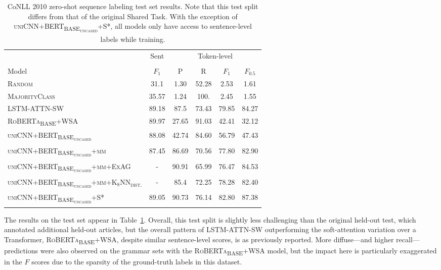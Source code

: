 \documentclass{clv3}
\begin{document}
\begin{table}
\caption[Main results]{CoNLL 2010 zero-shot sequence labeling test set results. Note that this test split differs from that of the original Shared Task. With the exception of \textsc{uniCNN+BERT\textsubscript{BASE\textsubscript{uncased}}+S*}, all models only have access to sentence-level labels while training.} 
\label{table:conll2010-test-results}
\begin{tabular}{lccccc}
\toprule
 & \multicolumn{1}{c}{Sent} & \multicolumn{4}{c}{Token-level} \\
 \cmidrule[0.75pt](lr){2-2}\cmidrule[0.75pt](lr){3-6} \\
Model & $F_1$ & P & R & $F_1$ & $F_{0.5}$ \\
\midrule
\textsc{Random} & 31.1 & 1.30 & 52.28 & 2.53 & 1.61 \\
\textsc{MajorityClass} & 35.57 & 1.24 & 100. & 2.45 & 1.55 \\
\midrule
\textsc{LSTM-ATTN-SW} & 89.18 & 87.5 & 73.43 & 79.85 & 84.27 \\
\textsc{RoBERTa\textsubscript{BASE}+WSA} & 89.97 & 27.65 & 91.03 & 42.41 & 32.12 \\
\midrule
\textsc{uniCNN+BERT\textsubscript{BASE\textsubscript{uncased}}} & 88.08 & 42.74 & 84.60 & 56.79 & 47.43 \\
\textsc{uniCNN+BERT\textsubscript{BASE\textsubscript{uncased}}+mm} & 87.45 & 86.69 & 70.56 & 77.80 & 82.90 \\
\textsc{uniCNN+BERT\textsubscript{BASE\textsubscript{uncased}}+mm+ExAG} & - & 90.91 & 65.99 & 76.47 & 84.53 \\
\textsc{uniCNN+BERT\textsubscript{BASE\textsubscript{uncased}}+mm+K$_8$NN\textsubscript{dist.}} & - & 85.4 & 72.25 & 78.28 & 82.40 \\
\midrule
\textsc{uniCNN+BERT\textsubscript{BASE\textsubscript{uncased}}+S*} & 89.05 & 90.73 & 76.14 & 82.80 & 87.38 \\
\bottomrule
\end{tabular}
\end{table} 

The results on the test set appear in Table~\ref{table:conll2010-test-results}. Overall, this test split is slightly less challenging than the original held-out test, which annotated additional held-out articles, but the overall pattern of \textsc{LSTM-ATTN-SW} outperforming the soft-attention variation over a Transformer, \textsc{RoBERTa\textsubscript{BASE}+WSA}, despite similar sentence-level scores, is as previously reported. More diffuse---and higher recall---predictions were also observed on the grammar sets with the \textsc{RoBERTa\textsubscript{BASE}+WSA} model, but the impact here is particularly exaggerated in the $F$ scores due to the sparsity of the ground-truth labels in this dataset. 
\end{document}
